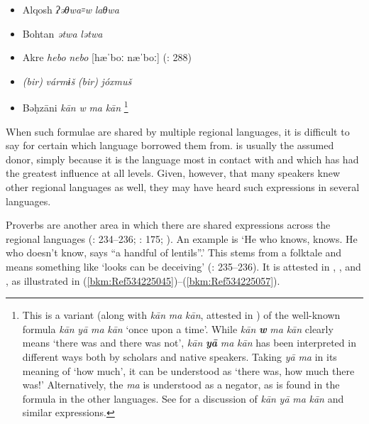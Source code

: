 \documentclass[output=paper]{langsci/langscibook}
\begin{document}
\begin{itemize}[noitemsep]

\item[]  Alqosh    \textit{ʔəθwa꞊w} \textit{laθwa} \citep[268]{Coghill2009}

\item[]  Bohtan    \textit{ətwa} \textit{lətwa} \citep{Fox2009}

\item[] Akre    \textit{hebo} \textit{nebo} [hæˈboː næˈboː] (\citealt{MacKenzie1962}: 288) 

\item[]     \textit{(bir)} \textit{vármɨš} \textit{(bir)} \textit{jóxmuš} \citep[175]{Garbell1965}

\item[]  Bəḥzāni    \textit{kān} \textit{w} \textit{ma} \textit{kān} \citep[404]{Jastrow1981}\footnote{This is a variant (along with \textit{kān} \textit{ma} \textit{kān}, attested in  ) of the well-known formula \textit{kān} \textit{yā} \textit{ma} \textit{kān} ‘once upon a time’. While \textit{kān} \textbf{\textit{w}} \textit{ma} \textit{kān} clearly means ‘there was and there was not’, \textit{kān} \textbf{\textit{yā}} \textit{ma} \textit{kān} has been interpreted in different ways both by scholars and native speakers. Taking \textit{yā} \textit{ma} in its meaning of ‘how much’, it can be understood as ‘there was, how much there was!’ Alternatively, the \textit{ma} is understood as a negator, as is found in the formula in the other languages. See \citet{Lentin1995} for a discussion of \textit{kān} \textit{yā} \textit{ma} \textit{kān} and similar expressions.}
\end{itemize}

When such formulae are shared by multiple regional languages, it is difficult to say for certain which language  borrowed them from.  is usually the assumed donor, simply because it is the language most in contact with  and which has had the greatest influence at all levels. Given, however, that many speakers knew other regional languages as well, they may have heard such expressions in several languages.

Proverbs are another area in which there are shared expressions across the regional languages (\citealt{Chyet1995}: 234–236; \citealt{Garbell1965}: 175; \citealt{Segal1955}). An example is ‘He who knows, knows. He who doesn’t know, says “a handful of lentils”.’ This stems from a folktale and means something like ‘looks can be deceiving’ (\citealt{Chyet1995}: 235–236). It is attested in ,  , and , as illustrated in (\ref{bkm:Ref534225045})–(\ref{bkm:Ref534225057}).
\end{document}
